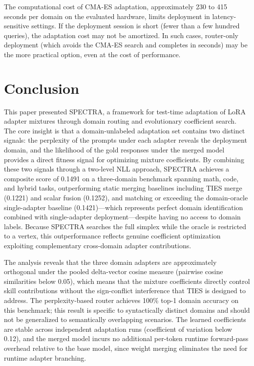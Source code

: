 \documentclass[preprint,12pt]{elsarticle}
\begin{document}
The computational cost of CMA-ES adaptation, approximately 230 to 415 seconds
per domain on the evaluated hardware, limits deployment in latency-sensitive
settings. If the deployment session is short (fewer than a few hundred queries),
the adaptation cost may not be amortized. In such cases, router-only deployment
(which avoids the CMA-ES search and completes in seconds) may be the more
practical option, even at the cost of performance.

\section{Conclusion}
\label{sec:conclusion}

This paper presented SPECTRA, a framework for test-time adaptation of LoRA
adapter mixtures through domain routing and evolutionary coefficient search.
The core insight is that a domain-unlabeled adaptation set contains two distinct
signals: the perplexity of the prompts under each adapter reveals the deployment
domain, and the likelihood of the gold responses under the merged model provides
a direct fitness signal for optimizing mixture coefficients. By combining these
two signals through a two-level NLL approach, SPECTRA achieves a composite score
of 0.1491 on a three-domain benchmark spanning math, code, and hybrid tasks,
outperforming static merging baselines including TIES merge (0.1221) and scalar
fusion (0.1252), and matching or exceeding the domain-oracle single-adapter
baseline (0.1421)---which represents perfect domain identification combined with
single-adapter deployment---despite having no access to domain labels. Because
SPECTRA searches the full simplex while the oracle is restricted to a vertex,
this outperformance reflects genuine coefficient optimization exploiting
complementary cross-domain adapter contributions.

The analysis reveals that the three domain adapters are approximately orthogonal
under the pooled delta-vector cosine measure (pairwise cosine similarities below
0.05), which means that the mixture coefficients directly control skill
contributions without the sign-conflict interference that TIES is designed to
address. The perplexity-based router achieves 100\% top-1 domain accuracy on
this benchmark; this result is specific to syntactically distinct domains and
should not be generalized to semantically overlapping scenarios. The learned
coefficients are stable across independent adaptation runs (coefficient of
variation below 0.12), and the merged model incurs no additional per-token
runtime forward-pass overhead relative to the base model, since weight merging
eliminates the need for runtime adapter branching.
\end{document}
